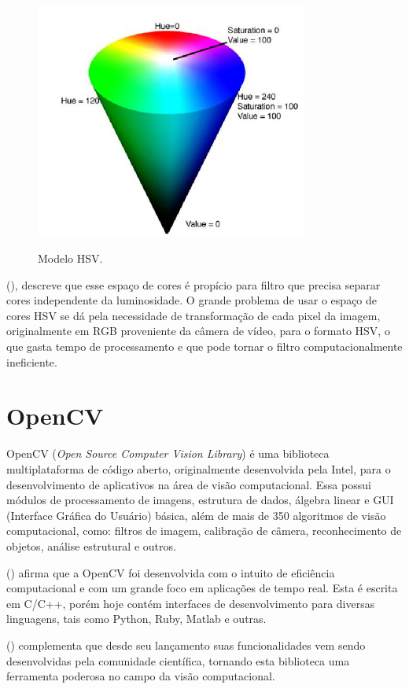\begin{figure}[!hbtp]
  \centering
   \caption{Modelo HSV.}
    \includegraphics[width = 0.8\textwidth]{Caps/Figs/ref-teorico/modelo-HSV.png}
   \label{fig:modeloHSV}
\end{figure}

\citeauthor{penharbel2004filtro} (\citeyear{penharbel2004filtro}), descreve que esse espaço de cores é propício para filtro que precisa separar cores independente da luminosidade. O grande problema de usar o espaço de cores HSV se dá pela necessidade de transformação de cada pixel da imagem, originalmente em RGB proveniente da câmera de vídeo, para o formato HSV, o que gasta tempo de processamento e que pode tornar o filtro computacionalmente ineficiente.


\section{OpenCV}
\label{sec:opencv}


OpenCV (\textit{Open Source Computer Vision Library}) é uma biblioteca multiplataforma de código aberto, originalmente desenvolvida pela Intel, para o desenvolvimento de aplicativos na área de visão computacional. Essa possui módulos de processamento de imagens, estrutura de dados, álgebra linear e GUI (Interface Gráfica do Usuário) básica, além de mais de 350 algoritmos de visão computacional, como: filtros de imagem, calibração de câmera, reconhecimento de objetos, análise estrutural e outros.

\citeauthor{bradski2008learning} (\citeyear{bradski2008learning}) afirma que a OpenCV foi desenvolvida com o intuito de eficiência computacional e com um grande foco em aplicações de tempo real. Esta é escrita em C/C++, porém hoje contém interfaces de desenvolvimento para diversas linguagens, tais como Python, Ruby, Matlab e outras.

\citeauthor{baggio2015opencv} (\citeyear{baggio2015opencv}) complementa que desde seu lançamento suas funcionalidades vem sendo desenvolvidas pela comunidade científica, tornando esta biblioteca uma ferramenta poderosa no campo da visão computacional.


 
